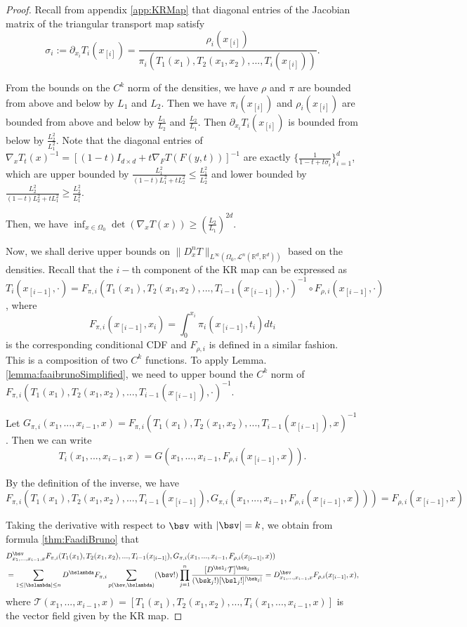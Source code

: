 \begin{proof}
Recall from appendix \ref{app:KRMap} that diagonal entries of the Jacobian matrix of the triangular transport map satisfy 
$$\sigma_i := \partial_{x_i}T_i(x_{[i]}) = \frac{\rho_i(x_{[i]})}{\pi_i(T_1(x_1), T_2(x_1, x_2),..., T_i(x_{[i]}))}.$$

From the bounds on the $C^k$ norm of the densities, we have $\rho$ and $\pi$ are bounded from above and below by $L_1$ and $L_2$. Then we have $\pi_i(x_{[i]})$ and $\rho_i(x_{[i]})$ are bounded from above and below by $\frac{L_1}{L_2}$ and $\frac{L_2}{L_1}$. Then $\partial_{x_i}T_i(x_{[i]})$ is bounded from below by $\frac{L_2^2}{L_1^2}$. Note that the diagonal entries of $\nabla_x T_t(x)^{-1} = [(1-t)I_{d\times d} + t\nabla_F T(F(y,t))]^{-1}$ are exactly $\{\frac{1}{1-t + t\sigma_i}\}_{i=1}^d$, which are upper bounded by $\frac{L_1^2}{(1-t)L_1^2 + tL_2^2} \leq \frac{L_1^2}{L_2^2}$ and lower bounded by $\frac{L_2^2}{(1-t)L_2^2 + tL_1^2} \geq \frac{L_2^2}{L_1^2}$.

Then, we have $\inf_{x\in\Omega_0}\det (\nabla_x T(x)) \geq \left(\frac{L_2}{L_1}\right)^{2d}$. 

Now, we shall derive upper bounds on $\|D^n_xT\|_{L^\infty(\Omega_0, \mathcal{L}^n(\mathbb{R}^d, \mathbb{R}^d))}$ based on the densities. Recall that the $i-$th component of the KR map can be expressed as $$T_i(x_{[i-1]}, \cdot) = F_{\pi, i}(T_1(x_1), T_2(x_1, x_2), ..., T_{i-1}(x_{[i-1]}), \cdot)^{-1} \circ F_{\rho, i}(x_{[i-1]}, \cdot)$$, where $$F_{\pi, i}(x_{[i-1]}, x_i)  = \int_{0}^{x_i} \pi_i(x_{[i-1]}, t_i)dt_i $$ is the corresponding conditional CDF and $F_{\rho, i}$ is defined in a similar fashion. 
This is a composition of two $C^k$ functions. To apply Lemma.\ref{lemma:faaibrunoSimplified}, we need to upper bound the $C^k$ norm of $F_{\pi, i}(T_1(x_1), T_2(x_1, x_2), ..., T_{i-1}(x_{[i-1]}), \cdot)^{-1}$. 


Let $G_{\pi, i}(x_1,...,x_{i-1}, x) = F_{\pi, i}(T_1(x_1), T_2(x_1, x_2), ..., T_{i-1}(x_{[i-1]}), x)^{-1}$. Then we can write $$T_i(x_1,...,x_{i-1}, x) = G(x_1, ..., x_{i-1}, F_{\rho, i}(x_{[i-1]}, x)).$$

By the definition of the inverse, we have $$F_{\pi, i}(T_1(x_1), T_2(x_1, x_2), ..., T_{i-1}(x_{[i-1]}), G_{\pi, i}(x_1,...,x_{i-1}, F_{\rho, i}(x_{[i-1]}, x))) = F_{\rho, i}(x_{[i-1]}, x)$$

Taking the derivative with respect to $\bsv$ with $|\bsv| = k$, we obtain from formula \ref{thm:FaadiBruno} that 
\begin{align*}
&D^\bsv_{x_1,...,x_{i-1},x} F_{\pi, i}(T_1(x_1), T_2(x_1, x_2), ..., T_{i-1}(x_{[i-1]}), G_{\pi, i}(x_1,...,x_{i-1}, F_{\rho, i}(x_{[i-1]}, x)) \\
&= \sum_{1\leq |\bslambda| \leq n}D^\bslambda F_{\pi,i}\sum_{p(\bsv,\bslambda)} (\bsv!)\prod_{j=1}^n\frac{[D^{\bsl_j}\mathcal{T}]^{\bsk_j}}{(\bsk_j!)[\bsl_j!]^{|\bsk_j|}} = D^\bsv_{x_1,...,x_{i-1},x}F_{\rho, i}(x_{[i-1]}, x), \\
\end{align*}
where $\mathcal{T}(x_1,...,x_{i-1}, x) = [T_1(x_1), T_2(x_1,x_2),...,T_i(x_1,...,x_{i-1},x)]$ is the vector field given by the KR map. 


\end{proof}
